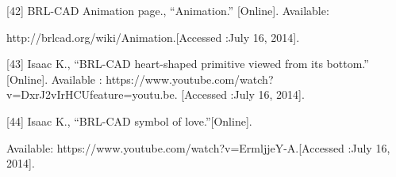 \documentclass[11pt, oneside]{Thesis} %
\begin{document}
[42] BRL-CAD Animation page., “Animation.” [Online]. Available:

http://brlcad.org/wiki/Animation.[Accessed :July 16, 2014].

[43] Isaac K., “BRL-CAD heart-shaped primitive viewed from its bottom.” [Online].
Available : https://www.youtube.com/watch?v=DxrJ2vIrHCUfeature=youtu.be.
[Accessed :July 16, 2014].

[44] Isaac K., “BRL-CAD symbol of love.”[Online].

Available: https://www.youtube.com/watch?v=ErmljjeY-A.[Accessed :July 16, 2014].



\backmatter

\appendix %



\end{document}
